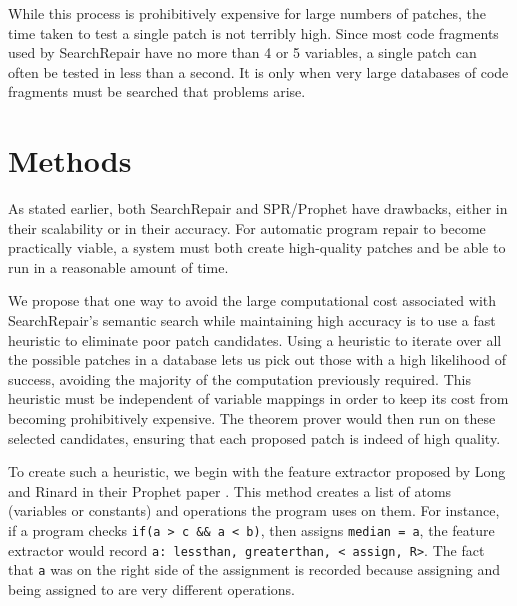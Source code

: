 \documentclass[conference]{IEEEtran}
\begin{document}
While this process is prohibitively expensive for large numbers of patches, the time taken to test a single patch is not terribly high. 
Since most code fragments used by SearchRepair have no more than 4 or 5 variables, a single patch can often be tested in less than a second. 
It is only when very large databases of code fragments must be searched that problems arise.


\section{Methods}


As stated earlier, both SearchRepair and SPR/Prophet have drawbacks, either in their scalability or in their accuracy. 
For automatic program repair to become practically viable, a system must both create high-quality patches and be able to run in a reasonable amount of time.

We propose that one way to avoid the large computational cost associated with SearchRepair's semantic search while maintaining high accuracy is to use a fast heuristic to eliminate poor patch candidates. 
Using a heuristic to iterate over all the possible patches in a database lets us pick out those with a high likelihood of success, avoiding the majority of the computation previously required. 
This heuristic must be independent of variable mappings in order to keep its cost from becoming prohibitively expensive. 
The theorem prover would then run on these selected candidates, ensuring that each proposed patch is indeed of high quality.

To create such a heuristic, we begin with the feature extractor proposed by Long and Rinard in their Prophet paper \cite{Prophet}. 
This method creates a list of atoms (variables or constants) and operations the program uses on them. 
For instance, if a program checks \texttt{if(a > c \&\& a < b)}, then assigns \texttt{median = a}, the feature extractor would record \texttt{a: lessthan, greaterthan, < assign, R>}. 
The fact that \texttt{a} was on the right side of the assignment is recorded because assigning and being assigned to are very different operations. 
\end{document}
